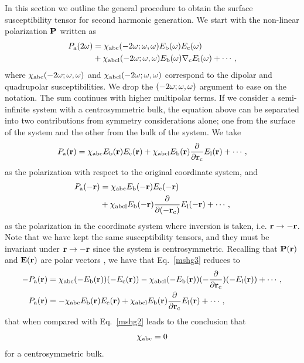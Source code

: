 \documentclass[floatfix,prb,aps,superscriptaddress,11pt,preprint,letterpaper]{revtex4}
\begin{document}
In this section we outline the general procedure to obtain the 
surface susceptibility tensor for second harmonic generation.
We start with the 
non-linear polarization $\mathbf{P}$ written as
\begin{align}\label{mshg}
P_{\mathrm{a}}(2\omega)&=\chi_{\mathrm{a}\mathrm{b}\mathrm{c}}(-2\omega;\omega,\omega)
E_{\mathrm{b}}(\omega)
E_{\mathrm{c}}(\omega)
\nonumber \\
&+
\chi_{\mathrm{a}\mathrm{b}\mathrm{c}\mathrm{l}}(-2\omega;\omega,\omega)
E_{\mathrm{b}}(\omega)\nabla_{\mathrm{c}} E_{\mathrm{l}}(\omega)
+\cdots,
\end{align}
where $\chi_{\mathrm{a}\mathrm{b}\mathrm{c}}(-2\omega;\omega,\omega)$ and 
$\chi_{\mathrm{a}\mathrm{b}\mathrm{c}\mathrm{l}}(-2\omega;\omega,\omega)$
correspond to the dipolar and quadrupolar susceptibilities.
We drop  the $(-2\omega;\omega,\omega)$ argument to ease on the notation.
The sum continues with higher multipolar terms.
If we consider a semi-infinite system with a centrosymmetric bulk, the
equation above can be separated into two contributions from symmetry 
considerations alone; one from the surface of the system and the other from
the bulk of the system. We take
\begin{equation}\label{mshg2}
P_{\mathrm{a}}(\mathbf{r})=\chi_{\mathrm{a}\mathrm{b}\mathrm{c}}E_{\mathrm{b}}(\mathbf{r})E_{\mathrm{c}}(\mathbf{r})
+
\chi_{\mathrm{a}\mathrm{b}\mathrm{c}\mathrm{l}}E_{\mathrm{b}}(\mathbf{r})\frac{\partial}{\partial
  \mathbf{r}_{\mathrm{c}}} E_{\mathrm{l}}(\mathbf{r}) 
+\cdots,
\end{equation}
as the polarization with respect to the original coordinate system, and 
\begin{align}\label{mshg3}
P_{\mathrm{a}}(-\mathbf{r})&=\chi_{\mathrm{a}\mathrm{b}\mathrm{c}}E_{\mathrm{b}}(-\mathbf{r})E_{\mathrm{c}}(-\mathbf{r})
\nonumber \\
&+
\chi_{\mathrm{a}\mathrm{b}\mathrm{c}\mathrm{l}}E_{\mathrm{b}}(-\mathbf{r})\frac{\partial}{\partial(-
  \mathbf{r}_{\mathrm{c}})} E_{\mathrm{l}}(-\mathbf{r}) 
+\cdots, 
\end{align}
as the polarization in the coordinate system where inversion is taken,
i.e. $\mathbf{r} \to -\mathbf{r}$. 
Note that we have kept the same susceptibility tensors, and they must be 
invariant under $\mathbf{r} \to -\mathbf{r}$ since the system is centrosymmetric.
Recalling that $\mathbf{P}(\mathbf{r})$ and $\mathbf{E}(\mathbf{r})$ are polar vectors 
\cite{jackson_classical_1975}, we have that Eq.~\eqref{mshg3} reduces to
\begin{align}\label{mshg4}
-P_{\mathrm{a}}(\mathbf{r})&=\chi_{\mathrm{a}\mathrm{b}\mathrm{c}}(-E_{\mathrm{b}}(\mathbf{r}))(-E_{\mathrm{c}}(\mathbf{r}))
-
\chi_{\mathrm{a}\mathrm{b}\mathrm{c}\mathrm{l}}(-E_{\mathrm{b}}(\mathbf{r}))(-\frac{\partial}{\partial\mathbf{r}_{\mathrm{c}}})(-
E_{\mathrm{l}}(\mathbf{r})) 
+\cdots,
\nonumber \\
P_{\mathrm{a}}(\mathbf{r})&=-\chi_{\mathrm{a}\mathrm{b}\mathrm{c}}E_{\mathrm{b}}(\mathbf{r})E_{\mathrm{c}}(\mathbf{r})
+
\chi_{\mathrm{a}\mathrm{b}\mathrm{c}\mathrm{l}}E_{\mathrm{b}}(\mathbf{r})\frac{\partial}{\partial\mathbf{r}_{\mathrm{c}}}
E_{\mathrm{l}}(\mathbf{r}) 
+\cdots,
\end{align}
that when compared with Eq.~\eqref{mshg2} leads to the conclusion that
\begin{equation}\label{sshg}
\chi_{\mathrm{a}\mathrm{b}\mathrm{c}}=0
\end{equation}
for a centrosymmetric bulk.
\end{document}
